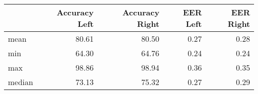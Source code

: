\begin{tabular}{lrrrr}
\toprule
{} &  Accuracy Left &  Accuracy Right &  EER Left &  EER Right \\
\midrule
mean   &          80.61 &           80.50 &      0.27 &       0.28 \\
min    &          64.30 &           64.76 &      0.24 &       0.24 \\
max    &          98.86 &           98.94 &      0.36 &       0.35 \\
median &          73.13 &           75.32 &      0.27 &       0.29 \\
\bottomrule
\end{tabular}

